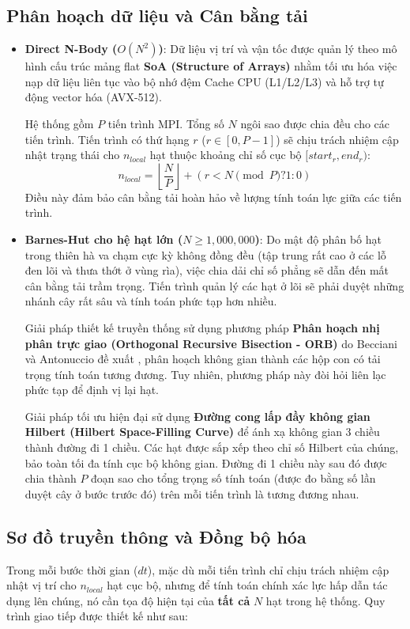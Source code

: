 \documentclass[12pt]{article}
\begin{document}
\subsection{Phân hoạch dữ liệu và Cân bằng tải}
\begin{itemize}
    \item \textbf{Direct N-Body ($O(N^2)$)}:
    Dữ liệu vị trí và vận tốc được quản lý theo mô hình cấu trúc mảng flat \textbf{SoA (Structure of Arrays)} nhằm tối ưu hóa việc nạp dữ liệu liên tục vào bộ nhớ đệm Cache CPU (L1/L2/L3) và hỗ trợ tự động vector hóa (AVX-512). 
    
    Hệ thống gồm $P$ tiến trình MPI. Tổng số $N$ ngôi sao được chia đều cho các tiến trình. Tiến trình có thứ hạng $r$ ($r \in [0, P-1]$) sẽ chịu trách nhiệm cập nhật trạng thái cho $n_{local}$ hạt thuộc khoảng chỉ số cục bộ $[start_r, end_r)$:
    \begin{equation}
    n_{local} = \left\lfloor \frac{N}{P} \right\rfloor + (r < N \pmod P ? 1 : 0)
    \end{equation}
    Điều này đảm bảo cân bằng tải hoàn hảo về lượng tính toán lực giữa các tiến trình.

    \item \textbf{Barnes-Hut cho hệ hạt lớn ($N \ge 1,000,000$)}:
    Do mật độ phân bố hạt trong thiên hà va chạm cực kỳ không đồng đều (tập trung rất cao ở các lỗ đen lõi và thưa thớt ở vùng rìa), việc chia dải chỉ số phẳng sẽ dẫn đến mất cân bằng tải trầm trọng. Tiến trình quản lý các hạt ở lõi sẽ phải duyệt những nhánh cây rất sâu và tính toán phức tạp hơn nhiều.
    
    Giải pháp thiết kế truyền thống sử dụng phương pháp \textbf{Phân hoạch nhị phân trực giao (Orthogonal Recursive Bisection - ORB)} do Becciani và Antonuccio đề xuất \cite{antonuccio1994}, phân hoạch không gian thành các hộp con có tải trọng tính toán tương đương. Tuy nhiên, phương pháp này đòi hỏi liên lạc phức tạp để định vị lại hạt. 
    
    Giải pháp tối ưu hiện đại sử dụng \textbf{Đường cong lấp đầy không gian Hilbert (Hilbert Space-Filling Curve)} để ánh xạ không gian 3 chiều thành đường đi 1 chiều. Các hạt được sắp xếp theo chỉ số Hilbert của chúng, bảo toàn tối đa tính cục bộ không gian. Đường đi 1 chiều này sau đó được chia thành $P$ đoạn sao cho tổng trọng số tính toán (được đo bằng số lần duyệt cây ở bước trước đó) trên mỗi tiến trình là tương đương nhau.
\end{itemize}

\subsection{Sơ đồ truyền thông và Đồng bộ hóa}
Trong mỗi bước thời gian ($dt$), mặc dù mỗi tiến trình chỉ chịu trách nhiệm cập nhật vị trí cho $n_{local}$ hạt cục bộ, nhưng để tính toán chính xác lực hấp dẫn tác dụng lên chúng, nó cần tọa độ hiện tại của \textbf{tất cả} $N$ hạt trong hệ thống. Quy trình giao tiếp được thiết kế như sau:
\end{document}

